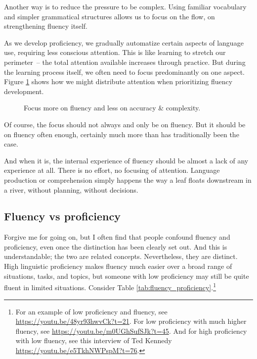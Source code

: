 Another way is to reduce the pressure to be complex. Using familiar vocabulary and simpler grammatical structures allows us to focus on the flow, on strengthening fluency itself. 

As we develop proficiency, we gradually automatize certain aspects of language use, requiring less conscious attention. This is like learning to stretch our perimeter~-- the total attention available increases through practice. But during the learning process itself, we often need to focus predominantly on one aspect. Figure \ref{fig:CAFtriangle2} shows how we might distribute attention when prioritizing fluency development.

\begin{figure}[ht]
\centering
{}
\caption{Focus more on fluency and less on accuracy \& complexity.}
\label{fig:CAFtriangle2}
\end{figure}

Of course, the focus should not always and only be on fluency. But it should be on fluency often enough, certainly much more than has traditionally been the case.

And when it is, the internal experience of fluency should be almost a lack of any experience at all. There is no effort, no focusing of attention. Language production or comprehension simply happens the way a leaf floats downstream in a river, without planning, without decisions.

\subsection{Fluency vs proficiency}

Forgive me for going on, but I often find that people confound fluency and proficiency, even once the distinction has been clearly set out. And this is understandable; the two are related concepts. Nevertheless, they are distinct. High linguistic proficiency makes fluency much easier over a broad range of situations, tasks, and topics, but someone with low proficiency may still be quite fluent in limited situations. Consider Table \ref{tab:fluency_proficiency}.\footnote{For an example of low proficiency and fluency, see \href{https://youtu.be/48yr93hwvCk?t=21}{https://youtu.be/48yr93hwvCk?t=21}. For low proficiency with much higher fluency, see \href{https://youtu.be/m0UGhSufSJk?t=45}{https://youtu.be/m0UGhSufSJk?t=45}. And for high proficiency with low fluency, see this interview of Ted Kennedy \href{https://youtu.be/e5TkhNWPspM?t=76}{https://youtu.be/e5TkhNWPspM?t=76}.}

